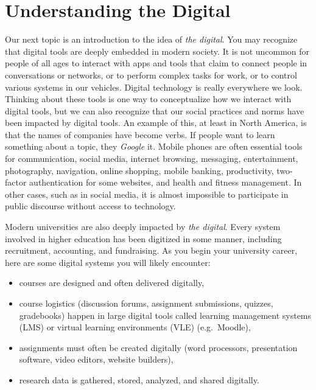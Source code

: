 \documentclass[
]{book}
\providecommand{\tightlist}{%
  \setlength{\itemsep}{0pt}\setlength{\parskip}{0pt}}
\theoremstyle{definition}
\theoremstyle{definition}
\theoremstyle{definition}
\theoremstyle{definition}
\theoremstyle{remark}
\begin{document}
\hypertarget{understanding-the-digital}{%
\section{Understanding the Digital}\label{understanding-the-digital}}

Our next topic is an introduction to the idea of \emph{the digital}. You may recognize that digital tools are deeply embedded in modern society. It is not uncommon for people of all ages to interact with apps and tools that claim to connect people in conversations or networks, or to perform complex tasks for work, or to control various systems in our vehicles. Digital technology is really everywhere we look. Thinking about these tools is one way to conceptualize how we interact with digital tools, but we can also recognize that our social practices and norms have been impacted by digital tools. An example of this, at least in North America, is that the names of companies have become verbs. If people want to learn something about a topic, they \emph{Google} it. Mobile phones are often essential tools for communication, social media, internet browsing, messaging, entertainment, photography, navigation, online shopping, mobile banking, productivity, two-factor authentication for some websites, and health and fitness management. In other cases, such as in social media, it is almost impossible to participate in public discourse without access to technology.

Modern universities are also deeply impacted by \emph{the digital}. Every system involved in higher education has been digitized in some manner, including recruitment, accounting, and fundraising. As you begin your university career, here are some digital systems you will likely encounter:

\begin{itemize}
\tightlist
\item
  courses are designed and often delivered digitally,
\item
  course logistics (discussion forums, assignment submissions, quizzes, gradebooks) happen in large digital tools called learning management systems (LMS) or virtual learning environments (VLE) (e.g.~Moodle),
\item
  assignments must often be created digitally (word processors, presentation software, video editors, website builders),
\item
  research data is gathered, stored, analyzed, and shared digitally.
\end{itemize}
\end{document}

